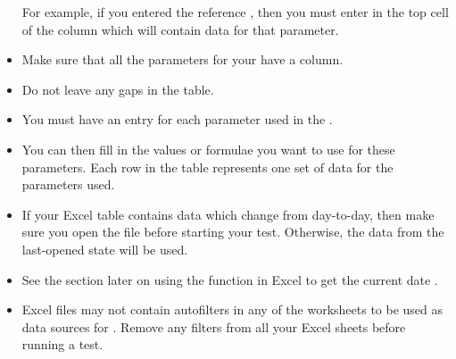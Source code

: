 \begin{itemize}
For example, if you entered the reference , then you must enter  in the top cell of the column which will contain data for that parameter. 
\item Make sure that all the parameters for your \gdcase{} have a column.
\item Do not leave any gaps in the table.
\item You must have an entry for each parameter used in the \gdcase{}. 
\item You can then fill in the values or formulae you want to use for these parameters. Each row in the table represents one set of data for the parameters used. 
\item If your Excel table contains data which change from day-to-day, then make sure you open the file before starting your test. Otherwise, the data from the last-opened state will be used.
\item See the section later on using the  function in Excel to get the current date . 
\item Excel files may not contain autofilters in any of the worksheets to be used as data sources for \app{}. Remove any filters from all your Excel sheets before running a test. 
\end{itemize}

